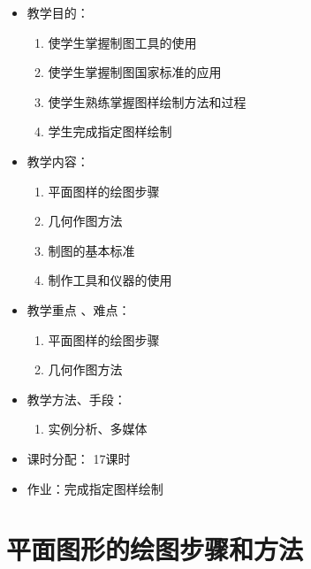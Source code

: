 \begin{itemize}
\item 教学目的：
\begin{enumerate}
\item 使学生掌握制图工具的使用
\item 使学生掌握制图国家标准的应用
\item 使学生熟练掌握图样绘制方法和过程
\item 学生完成指定图样绘制
\end{enumerate}
\item 教学内容：
\begin{enumerate}
\item 平面图样的绘图步骤
\item 几何作图方法
\item 制图的基本标准
\item 制作工具和仪器的使用
\end{enumerate}
\item 教学重点 、难点：
\begin{enumerate}
\item 平面图样的绘图步骤
\item 几何作图方法
\end{enumerate}
\item 教学方法、手段：
\begin{enumerate}
\item 实例分析、多媒体
\end{enumerate}
\item 课时分配：
17课时
\item 作业：完成指定图样绘制
\end{itemize}

\section{平面图形的绘图步骤和方法}

